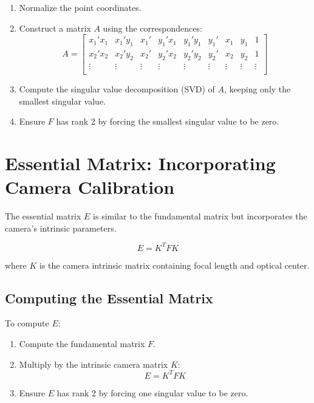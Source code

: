 \documentclass{article}
\begin{document}
\begin{enumerate}
    \item Normalize the point coordinates.
    \item Construct a matrix \( A \) using the correspondences:
    \begin{equation}
        A = 
        \begin{bmatrix}
            x_1' x_1 & x_1' y_1 & x_1' & y_1' x_1 & y_1' y_1 & y_1' & x_1 & y_1 & 1 \\
            x_2' x_2 & x_2' y_2 & x_2' & y_2' x_2 & y_2' y_2 & y_2' & x_2 & y_2 & 1 \\
            \vdots & \vdots & \vdots & \vdots & \vdots & \vdots & \vdots & \vdots & \vdots \\
        \end{bmatrix}
    \end{equation}
    \item Compute the singular value decomposition (SVD) of \( A \), keeping only the smallest singular value.
    \item Ensure \( F \) has rank 2 by forcing the smallest singular value to be zero.
\end{enumerate}

\section{Essential Matrix: Incorporating Camera Calibration}
The essential matrix \( E \) is similar to the fundamental matrix but incorporates the camera’s intrinsic parameters.

\begin{equation}
    E = K^T F K
\end{equation}

where \( K \) is the camera intrinsic matrix containing focal length and optical center.

\subsection{Computing the Essential Matrix}
To compute \( E \):

\begin{enumerate}
    \item Compute the fundamental matrix \( F \).
    \item Multiply by the intrinsic camera matrix \( K \):
    \begin{equation}
        E = K^T F K
    \end{equation}
    \item Ensure \( E \) has rank 2 by forcing one singular value to be zero.
\end{enumerate}
\end{document}
